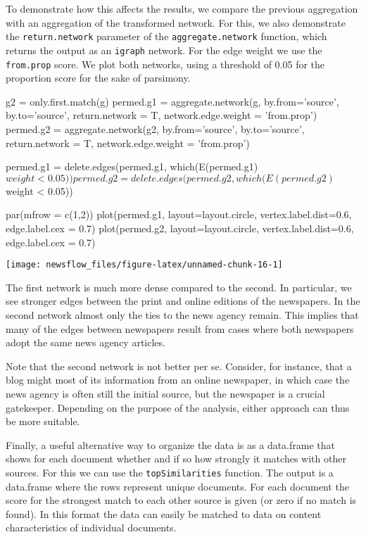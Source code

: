 To demonstrate how this affects the results, we compare the previous
aggregation with an aggregation of the transformed network. For this, we
also demonstrate the \texttt{return.network} parameter of the
\texttt{aggregate.network} function, which returns the output as an
\texttt{igraph} network. For the edge weight we use the
\texttt{from.prop} score. We plot both networks, using a threshold of
0.05 for the proportion score for the sake of parsimony.

\begin{Schunk}
\begin{Sinput}
g2 = only.first.match(g)
permed.g1 = aggregate.network(g, by.from='source', by.to='source', 
                              return.network = T, network.edge.weight = 'from.prop')
permed.g2 = aggregate.network(g2, by.from='source', by.to='source', 
                              return.network = T, network.edge.weight = 'from.prop')

permed.g1 = delete.edges(permed.g1, which(E(permed.g1)$weight < 0.05))
permed.g2 = delete.edges(permed.g2, which(E(permed.g2)$weight < 0.05))

par(mfrow = c(1,2))
plot(permed.g1, layout=layout.circle, vertex.label.dist=0.6, edge.label.cex = 0.7)
plot(permed.g2, layout=layout.circle, vertex.label.dist=0.6, edge.label.cex = 0.7)
\end{Sinput}

\texttt{[image: newsflow\_files/figure-latex/unnamed-chunk-16-1]} \end{Schunk}

The first network is much more dense compared to the second. In
particular, we see stronger edges between the print and online editions
of the newspapers. In the second network almost only the ties to the
news agency remain. This implies that many of the edges between
newspapers result from cases where both newspapers adopt the same news
agency articles.

Note that the second network is not better per se. Consider, for
instance, that a blog might most of its information from an online
newspaper, in which case the news agency is often still the initial
source, but the newspaper is a crucial gatekeeper. Depending on the
purpose of the analysis, either approach can thus be more suitable.

Finally, a useful alternative way to organize the data is as a
data.frame that shows for each document whether and if so how strongly
it matches with other sources. For this we can use the
\texttt{topSimilarities} function. The output is a data.frame where the
rows represent unique documents. For each document the score for the
strongest match to each other source is given (or zero if no match is
found). In this format the data can easily be matched to data on content
characteristics of individual documents.

